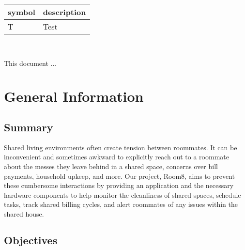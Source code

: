 \documentclass[12pt, titlepage]{article}
\begin{document}
\renewcommand{\arraystretch}{1.2}
\begin{tabular}{l l} 
  \toprule		
  \textbf{symbol} & \textbf{description}\\
  \midrule 
  T & Test\\
  \bottomrule
\end{tabular}\\



\newpage


This document ... 

\section{General Information}

\subsection{Summary}

  
Shared living environments often create tension between roommates. It can be inconvenient and sometimes awkward to explicitly reach out to a roommate about the messes they leave behind in a shared space, concerns over bill payments, household upkeep, and more. Our project, Room8,
aims to prevent these cumbersome interactions by providing an application and the
necessary hardware components to help monitor the cleanliness of shared spaces,
schedule tasks, track shared billing cycles, and alert roommates of any issues within the shared house.

\subsection{Objectives}

\end{document}
